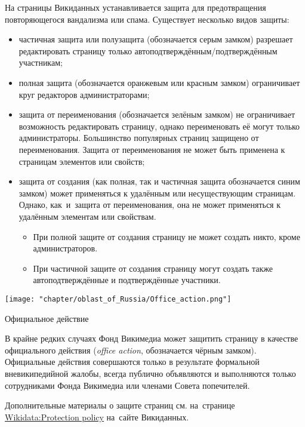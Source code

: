 На страницы Викиданных устанавливается защита 
для предотвращения повторяющегося вандализма или спама. 
Существует несколько видов защиты:
\begin{itemize}
  \item частичная защита или полузащита (обозначается серым замком) разрешает редактировать страницу только автоподтверждённым/подтверждённым участникам;
  \item полная защита (обозначается оранжевым или красным замком) ограничивает круг редакторов администраторами;
  \item защита от переименования (обозначается зелёным замком) не ограничивает возможность редактировать страницу, однако переименовать её могут только администраторы. Большинство популярных страниц защищено от переименования. Защита от переименования не может быть применена к страницам элементов или свойств;
  \item защита от создания (как полная, так и частичная защита обозначается синим замком) может применяться к удалённым или несуществующим страницам. Однако, как~и~защита от переименования, она не может применяться к удалённым элементам или свойствам.
  \begin{itemize}
	\item При полной защите от создания страницу не может создать никто, кроме администраторов.
	\item При частичной защите от создания страницу могут создать также автоподтверждённые и подтверждённые участники.
  \end{itemize}
\end{itemize}



\newpage
\begin{marginfigure}
\centering\texttt{[image: "chapter/oblast\_of\_Russia/Office\_action.png"]}
\caption [Иконка. Официальное действие.]{Официальное действие}%
\label{fig:legend_population}%
\end{marginfigure}
%
В крайне редких случаях Фонд Викимедиа может защитить страницу в качестве официального действия (\textit{office action}, обозначается чёрным замком). Официальные действия совершаются только в результате формальной вневикипедийной жалобы, всегда публично объявляются и выполняются только сотрудниками Фонда Викимедиа или членами Совета попечителей.


Дополнительные материалы о защите страниц см. 
на~странице \href{https://www.wikidata.org/wiki/Wikidata:Protection_policy}{Wikidata:Protection policy} 
на~сайте Викиданных.
